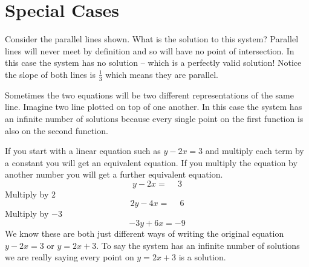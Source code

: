  \section*{Special Cases}
  \begin{multicols}{2}
  Consider the parallel lines shown. What is the solution to this system? Parallel lines will never meet by definition and so will have no point of intersection. In this case the system has no solution -- which is a perfectly valid solution! Notice the slope of both lines is $\frac{1}{3}$ which means they are parallel.
  
  Sometimes the two equations will be two different representations of the same line. Imagine two line plotted on top of one another. In this case the system has an infinite number of solutions because every single point on the first function is also on the second function. 
 	\columnbreak
 	\begin{center}
 	\end{center}
 \end{multicols}
 
 \example If you start with a linear equation such as $y -2 x =3$ and multiply each term by a constant you will get an equivalent equation. If you multiply the equation by another number you
 will get a further equivalent equation.
 \[y -2 x =\phantom{-}3 \]
 Multiply by $2$
\[2 y -4 x =\phantom{-}6\]
 Multiply by $-3$
\[-3y +6x = -9\]
\solution We know these are both just different ways of writing the original equation $y -2 x =3$ or $y =2 x +3$. To say the system has an infinite number of solutions we are really saying every point on $y =2 x +3$ is a solution. 
 
